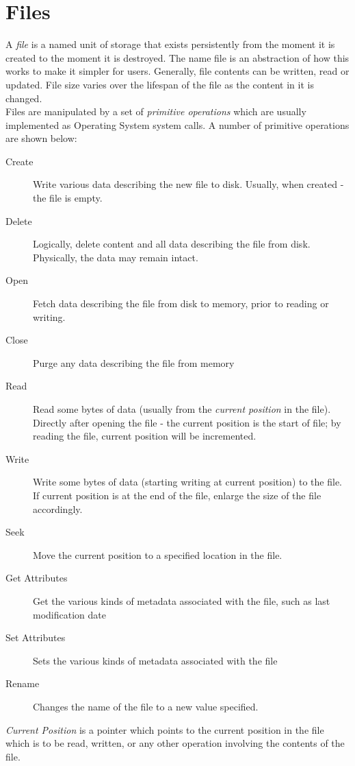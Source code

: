 
\section{Files}
A \textit{file} is a named unit of storage that exists persistently from the moment it is created to the moment it is destroyed. The name file is an abstraction of how this works to make it simpler for users. Generally, file contents can be written, read or updated. File size varies over the lifespan of the file as the content in it is changed.\\

Files are manipulated by a set of \textit{primitive operations} which are usually implemented as Operating System system calls. A number of primitive operations are shown below:
\begin{description}
    \item[Create] Write various data describing the new file to disk. Usually, when created - the file is empty.
    \item[Delete] Logically, delete content and all data describing the file from disk. Physically, the data may remain intact.
    \item[Open] Fetch data describing the file from disk to memory, prior to reading or writing.
    \item[Close] Purge any data describing the file from memory
    \item[Read] Read some bytes of data (usually from the \textit{current position} in the file). Directly after opening the file - the current position is the start of file; by reading the file, current position will be incremented.
    \item[Write] Write some bytes of data (starting writing at current position) to the file. If current position is at the end of the file, enlarge the size of the file accordingly.
    \item[Seek] Move the current position to a specified location in the file.
    \item[Get Attributes] Get the various kinds of metadata associated with the file, such as last modification date
    \item[Set Attributes] Sets the various kinds of metadata associated with the file
    \item[Rename] Changes the name of the file to a new value specified. 
\end{description}
\textit{Current Position} is a pointer which points to the current position in the file which is to be read, written, or any other operation involving the contents of the file.

